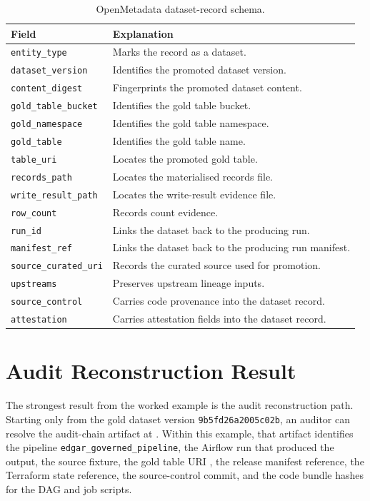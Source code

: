 \begin{table}[H]
  \centering
  \caption{OpenMetadata dataset-record schema.}
  \label{tab:schema-openmetadata-dataset}
  \renewcommand{\arraystretch}{1.12}
  \begin{tabularx}{\textwidth}{@{}p{}X@{}}
    \toprule
    \textbf{Field} & \textbf{Explanation} \\
    \midrule
    \texttt{entity\_type} & Marks the record as a dataset. \\
    \texttt{dataset\_version} & Identifies the promoted dataset version. \\
    \texttt{content\_digest} & Fingerprints the promoted dataset content. \\
    \texttt{gold\_table\_bucket} & Identifies the gold table bucket. \\
    \texttt{gold\_namespace} & Identifies the gold table namespace. \\
    \texttt{gold\_table} & Identifies the gold table name. \\
    \texttt{table\_uri} & Locates the promoted gold table. \\
    \texttt{records\_path} & Locates the materialised records file. \\
    \texttt{write\_result\_path} & Locates the write-result evidence file. \\
    \texttt{row\_count} & Records count evidence. \\
    \texttt{run\_id} & Links the dataset back to the producing run. \\
    \texttt{manifest\_ref} & Links the dataset back to the producing run manifest. \\
    \texttt{source\_curated\_uri} & Records the curated source used for promotion. \\
    \texttt{upstreams} & Preserves upstream lineage inputs. \\
    \texttt{source\_control} & Carries code provenance into the dataset record. \\
    \texttt{attestation} & Carries attestation fields into the dataset record. \\
    \bottomrule
  \end{tabularx}
\end{table}

\section{Audit Reconstruction Result}
\noindent
The strongest result from the worked example is the audit reconstruction path.
Starting only from the gold dataset version
\texttt{9b5fd26a2005c02b}, an auditor can resolve the audit-chain artifact at
. Within this example, that
artifact identifies the pipeline \texttt{edgar\_governed\_pipeline}, the
Airflow run that produced the output, the source fixture, the gold table URI
, the release manifest reference, the
Terraform state reference, the source-control commit, and the code bundle
hashes for the DAG and job scripts.

